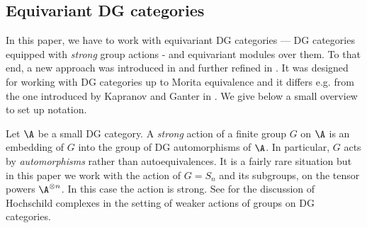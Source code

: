 \documentclass[12pt,a4paper,reqno]{amsart}
\begin{document}
\subsection{Equivariant DG categories}
\label{section-equivariant-dg-categories}

In this paper, we have to work with equivariant DG categories –– 
DG categories equipped with \textit{strong} group actions - and
 equivariant modules over them.  To that end, a new approach
 was introduced in
 \cite[\S4.8]{GyengeKoppensteinerLogvinenko-TheHeisenbergCategoryOfACategory}
 and further refined in
 \cite[\S5.2]{GyengeLogvinenko-TheHeisenbergAlgebraOfAVectorSpaceAndHochschildHomology}.
 It was 
 designed for working with DG categories up to Morita equivalence and it differs
 e.g. from the one   introduced by Kapranov and Ganter
in \cite{GanterKapranov-SymmetricAndExteriorPowersOfCategories}. 
We give below a small overview to set up notation. 

Let $\A$ be a small DG category. A \emph{strong} action 
of a finite group $G$ on $\A$ is an embedding of $G$ 
into the group of DG automorphisms of $\A$.  In particular, $G$ acts by 
\textit{automorphisms} rather than autoequivalences. It is a fairly rare situation 
but in this paper we work with the action of $G = S_n$ and its subgroups, on the tensor powers 
$\A^{\otimes n}$. In this case the action is strong. See \cite{Nordstrom-FiniteGroupActionsOnDGCategoriesAndHochschildHomology} for the discussion of
Hochschild complexes in the setting of weaker actions of groups on DG categories. 
\end{document}
